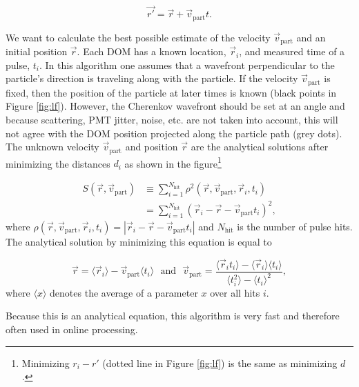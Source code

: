 \begin{equation}
\vec{r'} = \vec{r} + \vec{v}_{\textrm{part}}t.
\end{equation}

\noindent We want to calculate the best possible estimate of the velocity $\vec{v}_\textrm{part}$ and an initial position $\vec{r}$. Each DOM has a known location, $\vec{r}_i$, and measured time of a pulse, $t_i$. In this algorithm one assumes that a wavefront perpendicular to the particle's direction is traveling along with the particle. If the velocity $\vec{v}_\textrm{part}$ is fixed, then the position of the particle at later times is known (black points in Figure \ref{fig:lf}). However, the Cherenkov wavefront should be set at an angle and because scattering, PMT jitter, noise, etc. are not taken into account, this will not agree with the DOM position projected along the particle path (grey dots). The unknown velocity $\vec{v}_\textrm{part}$ and position $\vec{r}$ are the analytical solutions after minimizing the distances $d_i$ as shown in the figure\footnote{Minimizing $r_i - r'$ (dotted line in Figure \ref{fig:lf}) is the same as minimizing $d$.}

\begin{equation}
\label{eq:lf}
\begin{split}
S(\vec{r},\vec{v}_{\textrm{part}}) &\equiv \sum^{N_{\textrm{hit}}}_{i=1} \rho^2(\vec{r},\vec{v}_\textrm{part},\vec{r}_i,t_i)\\
&= \sum^{N_{\textrm{hit}}}_{i=1} \left(\vec{r}_i - \vec{r} - \vec{v}_\textrm{part}t_i \right)^2,
\end{split}
\end{equation}
\noindent where $\rho(\vec{r},\vec{v}_\textrm{part},\vec{r}_i,t_i) = \left|\vec{r}_i - \vec{r} - \vec{v}_\textrm{part}t_i \right|$ and $N_\textrm{hit}$ is the number of pulse hits. The analytical solution by minimizing this equation is equal to

\begin{equation}
\vec{r} = \langle\vec{r}_i\rangle - \vec{v}_\textrm{part}\langle t_i\rangle \ \ \ \textrm{and}\ \ \ \vec{v}_\textrm{part} = \frac{\langle \vec{r}_i t_i\rangle - \langle \vec{r}_i \rangle \langle t_i \rangle }{\langle t_i^2 \rangle - \langle t_i \rangle^2},
\end{equation}
\noindent where $\langle x \rangle$ denotes the average of a parameter $x$ over all hits $i$.

Because this is an analytical equation, this algorithm is very fast and therefore often used in online processing.
 
